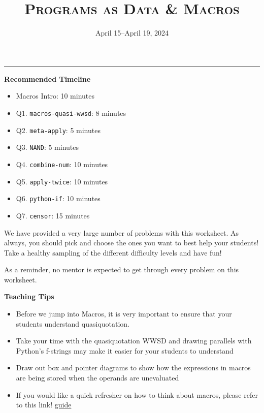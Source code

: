 \documentclass{exam}
\title{\textsc{Programs as Data \& Macros}}
\date{April 15--April 19, 2024}
\begin{document}
\maketitle
\rule{\textwidth}{0.15em}

\begin{meta}
\begin{blocksection}
    \textbf{Recommended Timeline}
    \begin{itemize}
        \item Macros Intro: 10 minutes
        \item Q1. \lstinline{macros-quasi-wwsd}: 8 minutes
        \item Q2. \lstinline{meta-apply}: 5 minutes
        \item Q3. \lstinline{NAND}: 5 minutes
        \item Q4. \lstinline{combine-num}: 10 minutes
        \item Q5. \lstinline{apply-twice}: 10 minutes
        \item Q6. \lstinline{python-if}: 10 minutes
        \item Q7. \lstinline{censor}: 15 minutes 
    \end{itemize}
\end{blocksection}
\vspace{5mm}

We have provided a very large number of problems with this worksheet. As always, you should pick and choose the ones you want to best help your students! Take a healthy sampling of the different difficulty levels and have fun!

As a reminder, no mentor is expected to get through every problem on this worksheet.

\end{meta}

\vspace{3mm}

\begin{meta}
\textbf{Teaching Tips}
\begin{itemize}
    \item Before we jump into Macros, it is very important to ensure that your students understand quasiquotation.
    \item Take your time with the quasiquotation WWSD and drawing parallels with Python's f-strings may make it easier for your students to understand 
    \item Draw out box and pointer diagrams to show how the expressions in macros are being stored when the operands are unevaluated
    \item If you would like a quick refresher on how to think about macros, please refer to this link! \href{https://docs.google.com/document/d/1JSbvtJ5bYUEhovDZd_gQnBvkG_WDcafmX-4B3QeIXZU/edit}{guide}
\end{itemize}
\end{meta}
\end{document}
